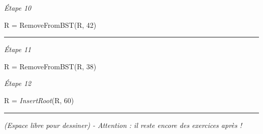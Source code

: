 \documentclass[11pt,a4paper]{article}
\begin{document}
\begin{center}
\begin{table}[ht!]
\begin{minipage}{0.50\textwidth}
\textit{\'Etape 10}

R = RemoveFromBST(R, 42)

\vspace*{7cm}

  \end{minipage}
\end{table}

\vspace*{-0.5cm}
\rule{1.0\linewidth}{0.75pt}



\begin{table}[ht!]
  \centering
  \begin{minipage}{0.50\textwidth}
    \centering

\textit{\'Etape 11}

R = RemoveFromBST(R, 38)

\vspace*{7cm}

  \end{minipage}
  \hfillx
  \begin{minipage}{0.50\textwidth}
    \centering

\textit{\'Etape 12}

R = \textit{InsertRoot}(R, 60)

\vspace*{7cm}

  \end{minipage}
\end{table}

\vspace*{-0.5cm}
\rule{1.0\linewidth}{0.75pt}

%
%
%
%
%

\end{center}

\textit{(Espace libre pour dessiner) - Attention : il reste encore des exercices après !}

\clearpage
\end{document}
